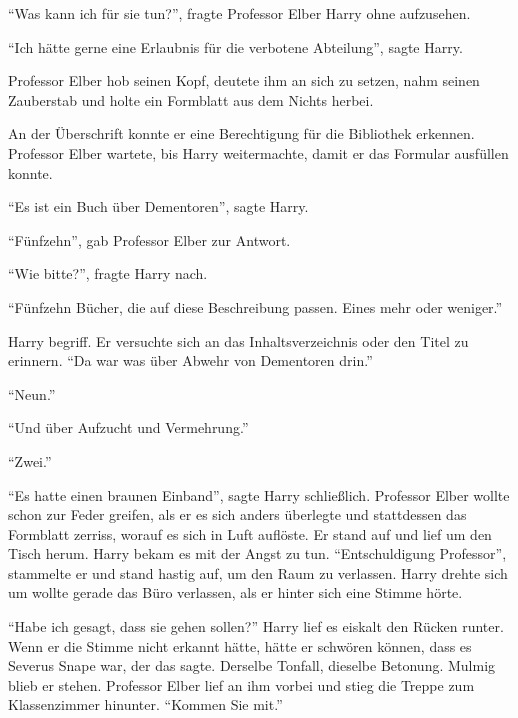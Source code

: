 \enquote{Was kann ich für sie tun?}, fragte Professor Elber Harry ohne aufzusehen.

\enquote{Ich hätte gerne eine Erlaubnis für die verbotene Abteilung}, sagte Harry.

Professor Elber hob seinen Kopf, deutete ihm an sich zu setzen, nahm seinen Zauberstab und holte ein Formblatt aus dem Nichts herbei.

An der Überschrift konnte er eine Berechtigung für die Bibliothek erkennen. Professor Elber wartete, bis Harry weitermachte, damit er das Formular ausfüllen konnte.

\enquote{Es ist ein Buch über Dementoren}, sagte Harry.

\enquote{Fünfzehn}, gab Professor Elber zur Antwort.

\enquote{Wie bitte?}, fragte Harry nach.

\enquote{Fünfzehn \gst Bücher, die auf diese Beschreibung passen. Eines mehr oder weniger.}

Harry begriff. Er versuchte sich an das Inhaltsverzeichnis oder den Titel zu erinnern. \enquote{Da war was über Abwehr von Dementoren drin.}

\enquote{Neun.}

\enquote{Und über Aufzucht und Vermehrung.}

\enquote{Zwei.}

\enquote{Es hatte einen braunen Einband}, sagte Harry schließlich. Professor Elber wollte schon zur Feder greifen, als er es sich anders überlegte und stattdessen das Formblatt zerriss, worauf es sich in Luft auflöste. Er stand auf und lief um den Tisch herum. Harry bekam es mit der Angst zu tun. \enquote{Entschuldigung Professor}, stammelte er und stand hastig auf, um den Raum zu verlassen. Harry drehte sich um wollte gerade das Büro verlassen, als er hinter sich eine Stimme hörte.

\enquote{Habe ich gesagt, dass sie gehen sollen?} Harry lief es eiskalt den Rücken runter. Wenn er die Stimme nicht erkannt hätte, hätte er schwören können, dass es Severus Snape war, der das sagte. Derselbe Tonfall, dieselbe Betonung. Mulmig blieb er stehen. Professor Elber lief an ihm vorbei und stieg die Treppe zum Klassenzimmer hinunter. \enquote{Kommen Sie mit.}

